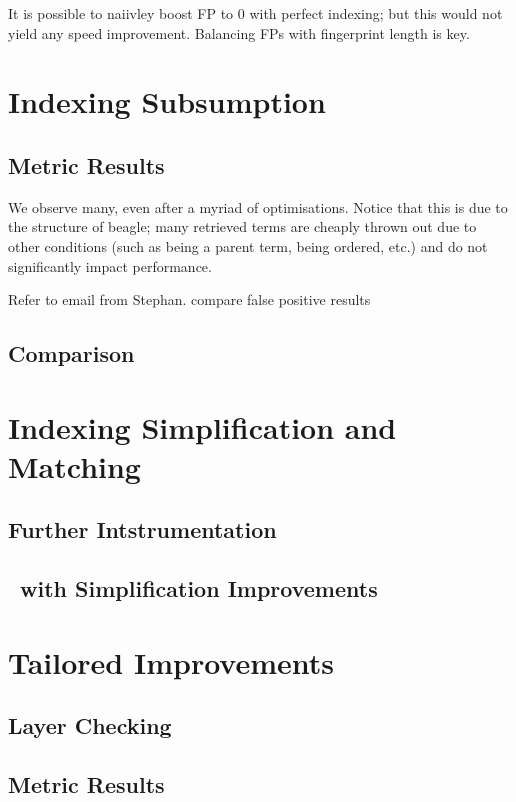It is possible to naiivley boost FP to 0 with perfect indexing; but this
would not yield any speed improvement. Balancing FPs with fingerprint
length is key.

\section{Indexing Subsumption}
\label{sec:indexresults}

\subsection{Metric Results}

We observe many, even after a myriad of optimisations. Notice
that this is due to the structure of beagle; many retrieved terms
are cheaply thrown out due to other conditions (such as being a parent
term, being ordered, etc.) and do not significantly impact performance.

Refer to email from Stephan. compare false positive results


\subsection{Comparison}

\section{Indexing Simplification and Matching}

\subsection{Further Intstrumentation}
\label{section:instr2}

\subsection{\Beagle\ with Simplification Improvements}

\section{Tailored Improvements}
\label{sec:tailresults}

\subsection{Layer Checking}

\subsection{Metric Results}



